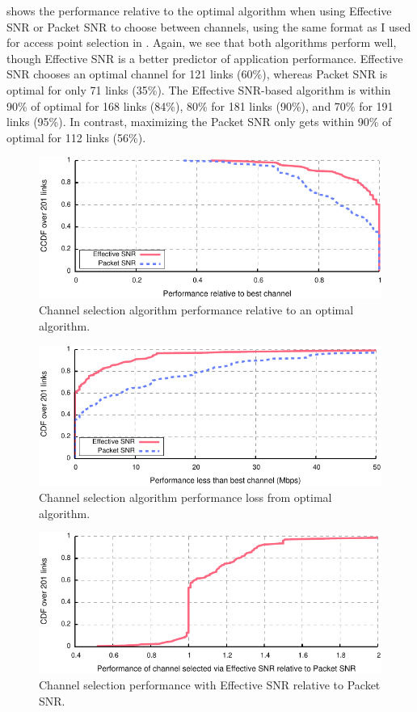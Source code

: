  shows the performance relative to the optimal algorithm when using Effective SNR or Packet SNR to choose between channels, using the same format as I used for access point selection in . Again, we see that both algorithms perform well, though Effective SNR is a better predictor of application performance. Effective SNR chooses an optimal channel for 121 links (60\%), whereas Packet SNR is optimal for only 71 links (35\%). The Effective SNR-based algorithm is within 90\% of optimal for 168 links (84\%), 80\% for 181 links (90\%), and 70\% for 191 links (95\%). In contrast, maximizing the Packet SNR only gets within 90\% of optimal for 112 links (56\%).

\begin{figure}[p]
	\centering
	\includegraphics[width=\textwidth]{figures/applications/chan_sel_ratio_opt.pdf}
	\caption{\label{fig:chan_sel_ratio_opt}Channel selection algorithm performance relative to an optimal algorithm.}
\end{figure}
\begin{figure}[p]
	\centering
	\includegraphics[width=\textwidth]{figures/applications/chan_sel_diff_opt.pdf}
	\caption{\label{fig:chan_sel_delta_opt}Channel selection algorithm performance loss from optimal algorithm.}
\end{figure}
\begin{figure}[p]
	\centering
	\includegraphics[width=\textwidth]{figures/applications/chan_sel_ratio.pdf}
	\caption{\label{fig:chan_sel_ratio}Channel selection performance with Effective SNR relative to Packet SNR.}
\end{figure}

